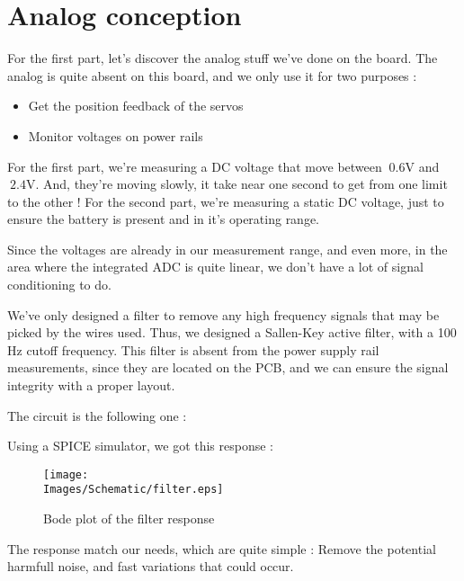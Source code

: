 \section{Analog conception}
For the first part, let's discover the analog stuff we've done on the board.
The analog is quite absent on this board, and we only use it for two purposes :
\begin{itemize}
    \item   Get the position feedback of the servos
    \item   Monitor voltages on power rails
\end{itemize}

For the first part, we're measuring a DC voltage that move between $~0.6 \si{\volt}$
and $~2.4 \si{\volt}$. And, they're moving slowly, it take near one second to get
from one limit to the other ! For the second part, we're measuring a static DC voltage,
just to ensure the battery is present and in it's operating range.

Since the voltages are already in our measurement range, and even more, in the area
where the integrated ADC is quite linear, we don't have a lot of signal conditioning
to do.

We've only designed a filter to remove any high frequency signals that may be picked
by the wires used. Thus, we designed a Sallen-Key active filter, with a 100 Hz cutoff
frequency. This filter is absent from the power supply rail measurements, since they
are located on the PCB, and we can ensure the signal integrity with a proper layout.

The circuit is the following one :


Using a SPICE simulator, we got this response :
\begin{figure}[!hbt]
    \centering
    \texttt{[image: \\Images/Schematic/filter.eps]}
    \caption{Bode plot of the filter response}
\end{figure}
\FloatBarrier

The response match our needs, which are quite simple : Remove the potential harmfull noise,
and fast variations that could occur.